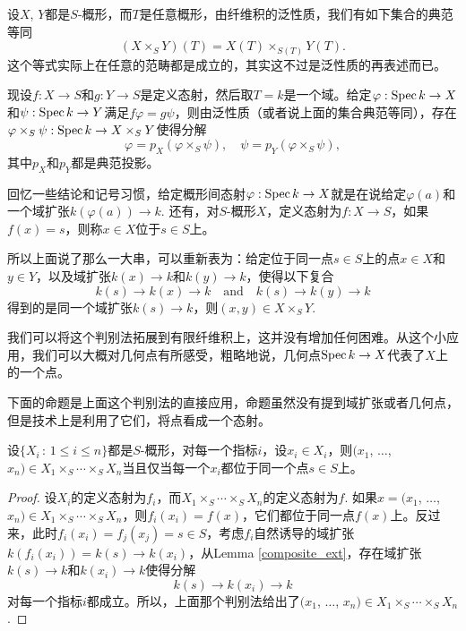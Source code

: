 \begin{para}[纤维积下的几何点]
设$X$, $Y$都是$S$-概形，而$T$是任意概形，由纤维积的泛性质，我们有如下集合的典范等同
\[
	(X\times_S Y)(T)=X(T)\times_{S(T)}Y(T).
\]
这个等式实际上在任意的范畴都是成立的，其实这不过是泛性质的再表述而已。

现设$f:X\to S$和$g:Y\to S$是定义态射，然后取$T=k$是一个域。给定$\varphi:\operatorname{Spec} k\to X$和$\psi:\operatorname{Spec} k\to Y$满足$f\varphi=g\psi$，则由泛性质（或者说上面的集合典范等同），存在$\varphi\times_S\psi:\operatorname{Spec} k\to X\times_S Y$使得分解
\[
	\varphi=p_X(\varphi\times_S\psi),\quad \psi=p_Y(\varphi\times_S\psi),
\]
其中$p_X$和$p_Y$都是典范投影。

回忆一些结论和记号习惯，给定概形间态射$\varphi:\operatorname{Spec} k\to X$就是在说给定$\varphi(a)$和一个域扩张$k(\varphi(a))\to k$. 还有，对$S$-概形$X$，定义态射为$f:X\to S$，如果$f(x)=s$，则称$x\in X$位于$s\in S$上。

所以上面说了那么一大串，可以重新表为：给定位于同一点$s\in S$上的点$x\in X$和$y\in Y$，以及域扩张$k(x)\to k$和$k(y)\to k$，使得以下复合
\[
	k(s)\to k(x)\to k \quad \text{and} \quad k(s)\to k(y)\to k
\]
得到的是同一个域扩张$k(s)\to k$，则$(x,y)\in X\times_S Y$. 
\end{para}

我们可以将这个判别法拓展到有限纤维积上，这并没有增加任何困难。从这个小应用，我们可以大概对几何点有所感受，粗略地说，几何点$\operatorname{Spec} k\to X$代表了$X$上的一个点。

下面的命题是上面这个判别法的直接应用，命题虽然没有提到域扩张或者几何点，但是技术上是利用了它们，将点看成一个态射。

\begin{pro}\label{pro.2.12}
	设$\{X_i\,:\,1\leq i\leq n\}$都是$S$-概形，对每一个指标$i$，设$x_i\in X_i$，则$(x_1$, $\dots$, $x_n)\in X_1\times_S \cdots\times_S X_n$当且仅当每一个$x_i$都位于同一个点$s\in S$上。
\end{pro}

\begin{proof}
设$X_i$的定义态射为$f_i$，而$X_1\times_S \cdots\times_S X_n$的定义态射为$f$. 如果$x=(x_1$, $\dots$, $x_n)\in X_1\times_S \cdots\times_S X_n$，则$f_i(x_i)=f(x)$，它们都位于同一点$f(x)$上。反过来，此时$f_i(x_i)=f_j(x_j)=s\in S$，考虑$f_i$自然诱导的域扩张$k(f_i(x_i))=k(s)\to k(x_i)$，从Lemma \ref{composite_ext}，存在域扩张$k(s)\to k$和$k(x_i)\to k$使得分解
\[
	k(s)\to k(x_i)\to k
\]
对每一个指标$i$都成立。所以，上面那个判别法给出了$(x_1$, $\dots$, $x_n)\in X_1\times_S \cdots\times_S X_n$.
\end{proof}

